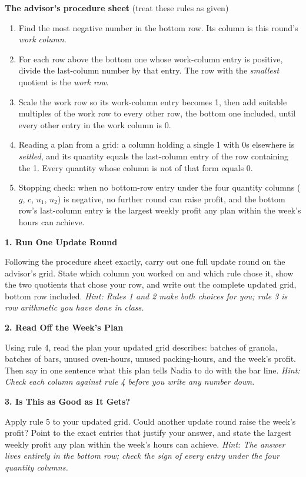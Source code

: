 \documentclass[11pt]{article}
\newcommand{\question}[1]{\medskip\noindent\textbf{#1}\par\smallskip}
\newcommand{\hint}[1]{{\small\color{gray}\textit{Hint: #1}}\par}
\begin{document}
\begin{databox}
\textbf{The advisor's procedure sheet} (treat these rules as given)
\begin{enumerate}[leftmargin=*, itemsep=2pt, topsep=3pt]
\item Find the most negative number in the bottom row. Its column is this round's
\emph{work column}.
\item For each row above the bottom one whose work-column entry is positive, divide the
last-column number by that entry. The row with the \emph{smallest} quotient is the
\emph{work row}.
\item Scale the work row so its work-column entry becomes 1, then add suitable multiples
of the work row to every other row, the bottom one included, until every other entry in
the work column is 0.
\item Reading a plan from a grid: a column holding a single 1 with 0s elsewhere is
\emph{settled}, and its quantity equals the last-column entry of the row containing the 1.
Every quantity whose column is not of that form equals 0.
\item Stopping check: when no bottom-row entry under the four quantity columns
($g$, $c$, $u_1$, $u_2$) is negative, no further round can raise profit, and the bottom
row's last-column entry is the largest weekly profit any plan within the week's hours can
achieve.
\end{enumerate}
\end{databox}

\question{1. Run One Update Round}
Following the procedure sheet exactly, carry out one full update round on the advisor's
grid. State which column you worked on and which rule chose it, show the two quotients
that chose your row, and write out the complete updated grid, bottom row included.
\hint{Rules 1 and 2 make both choices for you; rule 3 is row arithmetic you have done in class.}

\question{2. Read Off the Week's Plan}
Using rule 4, read the plan your updated grid describes: batches of granola, batches of
bars, unused oven-hours, unused packing-hours, and the week's profit. Then say in one
sentence what this plan tells Nadia to do with the bar line.
\hint{Check each column against rule 4 before you write any number down.}

\question{3. Is This as Good as It Gets?}
Apply rule 5 to your updated grid. Could another update round raise the week's profit?
Point to the exact entries that justify your answer, and state the largest weekly profit
any plan within the week's hours can achieve.
\hint{The answer lives entirely in the bottom row; check the sign of every entry under the four quantity columns.}
\end{document}
